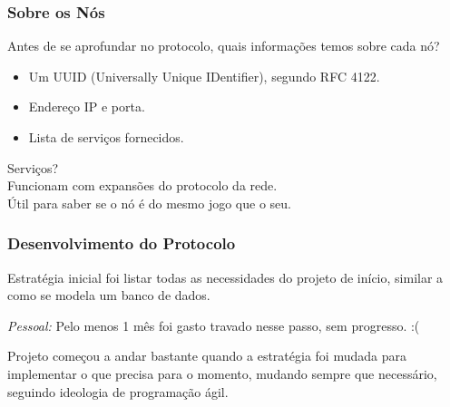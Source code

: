 \documentclass[brazil]{beamer}
\begin{document}
\begin{frame}
  \frametitle{Sobre os Nós}
  
  Antes de se aprofundar no protocolo, quais informações temos sobre cada nó?
  \pause
  \begin{itemize}
    \item Um UUID (Universally Unique IDentifier), segundo RFC 4122.
    \pause
    \item Endereço IP e porta.
    \pause
    \item Lista de serviços fornecidos.
  \end{itemize}
  \vspace{15pt}
  \pause
  Serviços? \\
  \pause
  Funcionam com expansões do protocolo da rede. \\
  Útil para saber se o nó é do mesmo jogo que o seu.
  
\end{frame}
\begin{frame}
  \frametitle{Desenvolvimento do Protocolo}
  
  Estratégia inicial foi listar todas as necessidades do projeto de início,
  similar a como se modela um banco de dados.
  
  \pause
  \vspace{10pt}
  
  \textit{Pessoal:} Pelo menos 1 mês foi gasto travado nesse passo, sem progresso. :( \\
  
  \pause
  \vspace{20pt}
  
  Projeto começou a andar bastante quando a estratégia foi mudada para
  implementar o que precisa para o momento, mudando sempre que necessário,
  seguindo ideologia de programação ágil.
\end{frame}
\end{document}
